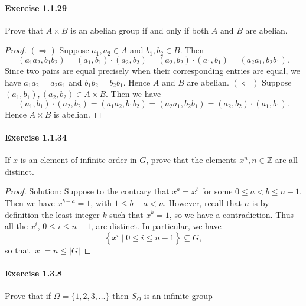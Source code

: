 \documentclass{article}
\theoremstyle{definition}
\begin{document}
\paragraph{Exercise 1.1.29} Prove that $A \times B$ is an abelian group if and only if both $A$ and $B$ are abelian.
\begin{proof}
    $(\Rightarrow)$ Suppose $a_1, a_2 \in A$ and $b_1, b_2 \in B$. Then
$$
\left(a_1 a_2, b_1 b_2\right)=\left(a_1, b_1\right) \cdot\left(a_2, b_2\right)=\left(a_2, b_2\right) \cdot\left(a_1, b_1\right)=\left(a_2 a_1, b_2 b_1\right) .
$$
Since two pairs are equal precisely when their corresponding entries are equal, we have $a_1 a_2=a_2 a_1$ and $b_1 b_2=b_2 b_1$. Hence $A$ and $B$ are abelian.
$(\Leftarrow)$ Suppose $\left(a_1, b_1\right),\left(a_2, b_2\right) \in A \times B$. Then we have
$$
\left(a_1, b_1\right) \cdot\left(a_2, b_2\right)=\left(a_1 a_2, b_1 b_2\right)=\left(a_2 a_1, b_2 b_1\right)=\left(a_2, b_2\right) \cdot\left(a_1, b_1\right) .
$$
Hence $A \times B$ is abelian.
\end{proof}


\paragraph{Exercise 1.1.34} If $x$ is an element of infinite order in $G$, prove that the elements $x^{n}, n \in \mathbb{Z}$ are all distinct.
\begin{proof}
    Solution: Suppose to the contrary that $x^a=x^b$ for some $0 \leq a<b \leq n-1$. Then we have $x^{b-a}=1$, with $1 \leq b-a<n$. However, recall that $n$ is by definition the least integer $k$ such that $x^k=1$, so we have a contradiction. Thus all the $x^i$, $0 \leq i \leq n-1$, are distinct. In particular, we have
$$
\left\{x^i \mid 0 \leq i \leq n-1\right\} \subseteq G,
$$
so that $|x|=n \leq|G|$
\end{proof}


\paragraph{Exercise 1.3.8} Prove that if $\Omega=\{1,2,3, \ldots\}$ then $S_{\Omega}$ is an infinite group
\end{document}
